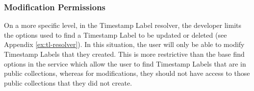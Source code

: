\subsubsection{Modification Permissions}
On a more specific level, in the Timestamp Label resolver, the developer limits the options used to find a Timestamp Label to be updated or deleted (see Appendix \ref{ex:tl-resolver}).  In this situation, the user will only be able to modify Timestamp Labels that they created.  This is more restrictive than the base find options in the service which allow the user to find Timestamp Labels that are in public collections, whereas for modifications, they should not have access to those public collections that they did not create.